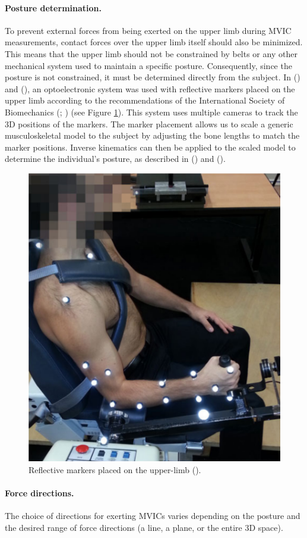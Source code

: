 \paragraph*{Posture determination.} To prevent external forces from being exerted on the upper limb during MVIC measurements, contact forces over the upper limb itself should also be minimized. This means that the upper limb should not be constrained by belts or any other mechanical system used to maintain a specific posture. Consequently, since the posture is not constrained, it must be determined directly from the subject. In (\cite{rezzougUpperLimbIsometricForce2021b}) and (\cite{hernandezHumanUpperlimbForce2016a}), an optoelectronic system was used with reflective markers placed on the upper limb according to the recommendations of the International Society of Biomechanics (\cite{wuISBRecommendationDefinitions2005}; \cite{senkRotationSequenceImportant2006a}) (see Figure \ref{fig:hernandez_opto}). This system uses multiple cameras to track the 3D positions of the markers. The marker placement allows us to scale a generic musculoskeletal model to the subject by adjusting the bone lengths to match the marker positions. Inverse kinematics can then be applied to the scaled model to determine the individual's posture, as described in (\cite{luBonePositionEstimation1999}) and (\cite{rouxEvaluationGlobalOptimisation2002}).
\begin{figure}[!htb]
    \captionsetup{justification=centering}
        \centering
        \includegraphics[trim={0 0 0 0},clip,width=0.4\linewidth]{img/chapter_1/hernandez_optoelectronic.png}
    \caption{Reflective markers placed on the upper-limb (\cite{hernandezHumanUpperlimbForce2016a}).}
    \label{fig:hernandez_opto}
\end{figure}

\paragraph*{Force directions.} The choice of directions for exerting MVICs varies depending on the posture and the desired range of force directions (a line, a plane, or the entire 3D space). 

